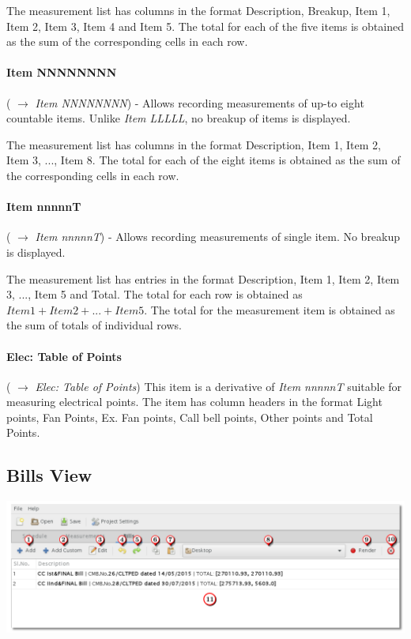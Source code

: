 \documentclass[twoside,a4paper]{refart}
\begin{document}
	 The measurement list has columns in the format Description, Breakup, Item 1, Item 2, Item 3, Item 4 and Item 5. The total for each of the five items is obtained as the sum of the corresponding cells in each row.
	 
	 \paragraph{Item NNNNNNNN} (\fbox{\emph{$+$}} $\rightarrow$ \emph{Item NNNNNNNN}) - Allows recording measurements of up-to eight countable items. Unlike \emph{Item LLLLL}, no breakup of items is displayed.
	 
	 The measurement list has columns in the format Description, Item 1, Item 2, Item 3, ..., Item 8. The total for each of the eight items is obtained as the sum of the corresponding cells in each row.
	 
	 \paragraph{Item nnnnnT} (\fbox{\emph{$+$}} $\rightarrow$ \emph{Item nnnnnT}) - Allows recording measurements of single item. No breakup is displayed.
	 
	 The measurement list has entries in the format Description, Item 1, Item 2, Item 3, ..., Item 5 and Total. The total for each row is obtained as $Item1 + Item2 + ... + Item 5$. The total for the measurement item is obtained as the sum of totals of individual rows.
	 
	 \paragraph{Elec: Table of Points} (\fbox{\emph{$+$}} $\rightarrow$ \emph{Elec: Table of Points}) This item is a derivative of \emph{Item nnnnnT} suitable for measuring electrical points. The item has column headers in the format Light points, Fan Points, Ex. Fan points, Call bell points, Other points and Total Points.
	 
	 \subsection{Bills View}
	 
	 \begin{maxipage}
	 	\includegraphics[width=1\linewidth]{screenshots/window_bill.png}
	 \end{maxipage}
	 
\end{document}
